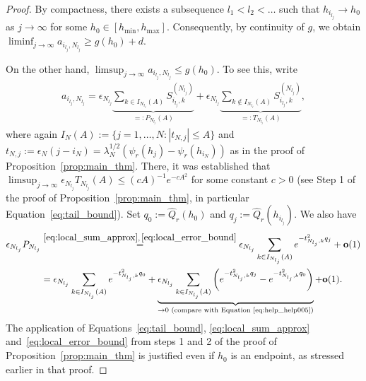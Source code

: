 \begin{proof}
    By compactness, there exists a subsequence $l_1<l_2<\dots$ such that $h_{i_{l_j}}\to h_0$ as $j\to\infty$ for some $h_0\in[h_{\min},h_{\max}]$. Consequently, by continuity of $g$, we obtain $\liminf_{j\to\infty}a_{i_{l_j},N_{l_j}}\ge g(h_0)+d$.

    On the other hand, $\limsup_{j\to\infty}a_{i_{l_j},N_{l_j}}\le g(h_0)$. To see this, write
    \begin{align}\label{eq:proof_main_thm2_001}
        a_{i_{l_j},N_{l_j}}=\epsilon_{N_{l_j}}\underbrace{\sum_{k\in I_{N_{l_j}}(A)}S_{i_{l_j},k}^{(N_{l_j})}}_{=:P_{N_{l_j}}(A)}+\epsilon_{N_{l_j}}\underbrace{\sum_{k\notin I_{N_{l_j}}(A)}S_{i_{l_j},k}^{(N_{l_j})}}_{=:T_{N_{l_j}}(A)},
    \end{align}
    where again $I_N(A):=\{j=1,\dots,N:|t_{N,j}|\le A\}$ and $t_{N,j}:=\epsilon_N(j-i_N)=\lambda_N^{1/2}(\psi_r(h_j)-\psi_r(h_{i_N}))$ as in the proof of Proposition~\ref{prop:main_thm}. There, it was established that $\limsup_{j\to\infty}\epsilon_{N_{l_j}}T_{N_{l_j}}(A)\le(cA)^{-1}e^{-cA^2}$ for some constant $c>0$ (see Step 1 of the proof of Proposition~\ref{prop:main_thm}, in particular Equation~\eqref{eq:tail_bound}). Set $q_0:=\hat{Q}_r(h_0)$ and $q_j:=\hat{Q}_r(h_{i_{l_j}})$. We also have
    \begin{equation}\label{eq:proof_main_thm2_002}
        \begin{aligned}
            \epsilon_{N_{l_j}}P_{N_{l_j}}&\stackrel{\eqref{eq:local_sum_approx},\,\eqref{eq:local_error_bound}}{=}\epsilon_{N_{l_j}}\sum_{k\in I_{N_{l_j}}(A)}e^{-t_{N_{l_j},k}^2q_j}+\mathbf{o}(1)\\&
            =\epsilon_{N_{l_j}}\sum_{k\in I_{N_{l_j}}(A)}e^{-t_{N_{l_j},k}^2q_0}+\underbrace{\epsilon_{N_{l_j}}\sum_{k\in I_{N_{l_j}}(A)}\left(e^{-t_{N_{l_j},k}^2q_j}-e^{-t_{N_{l_j},k}^2q_0}\right)}_{\to0\text{ (compare with Equation~\eqref{eq:help_help005})}}+\mathbf{o}(1).
        \end{aligned}
    \end{equation}
    The application of Equations~\eqref{eq:tail_bound}, \eqref{eq:local_sum_approx} and~\eqref{eq:local_error_bound} from steps 1 and 2 of the proof of Proposition~\ref{prop:main_thm} is justified even if $h_0$ is an endpoint, as stressed earlier in that proof.


\end{proof}
